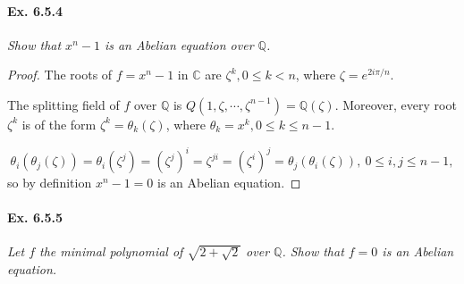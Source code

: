 \documentclass[11pt,a4paper]{article}
\newcommand{\Q}{\mathbb{Q}}
\newcommand{\C}{\mathbb{C}}
\begin{document}
\paragraph{Ex. 6.5.4}

{\it Show that $x^n-1$ is an Abelian equation over $\Q$.
}

\begin{proof}
The roots of $f=x^n-1$ in $\C$ are $\zeta^k, 0\leq k < n$, where $\zeta = e^{2i\pi/n}$.

The splitting field of $f$ over $\Q$ is $Q(1,\zeta,\cdots,\zeta^{n-1}) = \Q(\zeta)$. Moreover, every root $\zeta^k$ is of the form $\zeta^k = \theta_k(\zeta)$, where $\theta_k = x^k,0\leq k \leq n-1$.

$$\theta_i(\theta_j(\zeta)) = \theta_i(\zeta^j) = (\zeta^j)^i = \zeta^{ji} = (\zeta^i)^j = \theta_j(\theta_i(\zeta)),\ 0\leq i,j \leq n-1,$$ so by definition $x^n-1=0$ is an Abelian equation.
\end{proof}

\paragraph{Ex. 6.5.5}

{\it Let $f$ the minimal polynomial of $\sqrt{2+\sqrt{2}}$ over $\Q$. Show that $f=0$ is an Abelian equation.
}
\end{document}
